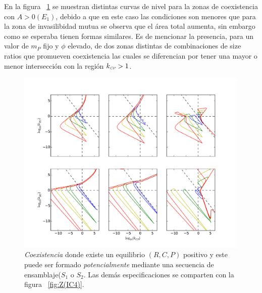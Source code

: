 En la figura  ~\ref{fig:PSCoexistence} se muestran distintas curvas de nivel para la zonas de coexistencia con $A>0(E_1)$, debido a que en este caso las condiciones son menores que para la zona de invasilibidad mutua se observa que el \'area total aumenta, sin embargo como se esperaba tienen formas similares. Es de mencionar la presencia, para un valor de $m_P$ fijo y $\phi$ elevado, de dos zonas distintas de combinaciones de size ratios que promueven coexistencia las cuales se diferencian por tener una mayor o menor intersecci\'on con la regi\'on $k_{\textit{\tiny CP}} > 1$. \\

\begin{figure}
  \centering
  \includegraphics[width = 0.99\textwidth]{./Plots/CoexistenceAcGrGr.pdf}
  \caption[Env $Coexistencia$]{\emph{Coexistencia} donde existe un equilibrio $(R,C,P)$ positivo y este puede ser formado \emph{potencialmente} mediante una secuencia de ensamblaje($S_1$ o $S_2$. Las dem\'as especificaciones se comparten con la figura ~\ref{fig:Z(IC4)}.}
  \label{fig:PSCoexistence}
\end{figure}

























